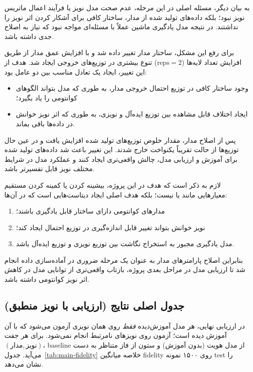 به بیان دیگر، مسئله اصلی در این مرحله، عدم صحت مدل نویز یا فرآیند اعمال ماتریس نویز نبود؛ بلکه داده‌های تولید شده از مدار، ساختار کافی برای آشکار کردن اثر نویز را نداشتند. در نتیجه مدل یادگیری ماشین عملاً با مسئله‌ای مواجه نبود که نیاز به اصلاح جدی داشته باشد.

برای رفع این مشکل، ساختار مدار تغییر داده شد و با افزایش عمق مدار از طریق افزایش تعداد لایه‌ها
($\mathrm{reps}=2$)
تنوع بیشتری در توزیع‌های خروجی ایجاد شد. هدف از این تغییر، ایجاد یک تعادل مناسب بین دو عامل بود:

\begin{itemize}
	\item وجود ساختار کافی در توزیع احتمال خروجی مدار، به طوری که مدل بتواند الگوهای کوانتومی را یاد بگیرد؛
	\item ایجاد اختلاف قابل مشاهده بین توزیع ایده‌آل و نویزی، به طوری که اثر نویز خوانش در داده‌ها باقی بماند.
\end{itemize}

پس از اصلاح مدار، مقدار خلوص توزیع‌های تولید شده افزایش یافت و در عین حال توزیع‌ها از حالت تقریباً یکنواخت خارج شدند. این تغییر باعث شد داده‌های تولید شده برای آموزش و ارزیابی مدل، چالش واقعی‌تری ایجاد کنند و عملکرد مدل در شرایط مختلف نویز قابل تفسیرتر باشد.

لازم به ذکر است که هدف در این پروژه، بیشینه کردن یا کمینه کردن مستقیم معیارهایی مانند
یا
نیست؛ بلکه هدف اصلی ایجاد دیتاست‌هایی است که در آن‌ها:
\begin{enumerate}
	\item مدارهای کوانتومی دارای ساختار قابل یادگیری باشند؛
	\item نویز خوانش بتواند تغییر قابل اندازه‌گیری در توزیع احتمال ایجاد کند؛
	\item مدل یادگیری مجبور به استخراج نگاشت بین توزیع نویزی و توزیع ایده‌آل باشد.
\end{enumerate}

بنابراین اصلاح پارامترهای مدار
به عنوان یک مرحله ضروری در آماده‌سازی داده انجام شد تا ارزیابی مدل در مراحل بعدی پروژه، بازتاب واقعی‌تری از توانایی مدل در کاهش اثر نویز کوانتومی داشته باشد.


\subsection{جدول اصلی نتایج (ارزیابی با نویز منطبق)}

در ارزیابی نهایی، هر مدل آموزش‌دیده \emph{فقط} روی همان نویزی آزمون می‌شود که با آن آموزش دیده است؛ آزمون روی نویزهای نامرتبط انجام نمی‌شود. برای هر جفت $(\text{مدار}, \text{نویز})$، baseline از مدل هویت (بدون آموزش) و ستون  از فاز متناظر به دست می‌آید. جدول~\ref{tab:main-fidelity} خلاصه میانگین fidelity روی ۱۵۰۰ نمونه test را نشان می‌دهد.

